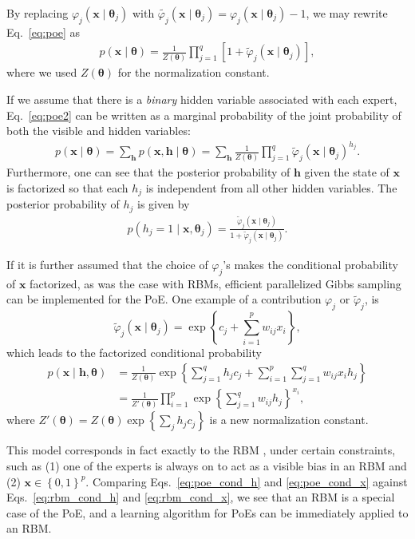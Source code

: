 \documentclass[dissertation,nocontribution]{aaltoseries}
\newcommand{\vect}[1]{\mathbf{#1}}
\newcommand{\vects}[1]{\boldsymbol{#1}}
\newcommand{\vh}[0]{\vect{h}}
\newcommand{\vx}[0]{\vect{x}}
\newcommand{\TT}[0]{{\vects{\theta}}}
\begin{document}
By replacing $\varphi_j(\vx \mid \TT_j)$ with
$\tilde{\varphi_j}(\vx \mid
\TT_j)=\varphi_j(\vx\mid\TT_j)-1$, we may rewrite
Eq.~\eqref{eq:poe} as
\begin{align}
    \label{eq:poe2}
    p(\vx \mid \TT) = \frac{1}{Z(\TT)}\prod_{j=1}^q \left[ 1 +
    \tilde{\varphi}_j(\vx \mid
    \TT_j)\right],
\end{align}
where we used $Z(\TT)$ for the normalization constant. 

If we assume that there is a \textit{binary} hidden variable
associated with each expert, Eq.~\eqref{eq:poe2} can be
written as a marginal probability of the joint
probability of both the visible and hidden variables:
\begin{align}
    \label{eq:poe2_joint}
    p(\vx \mid \TT) = \sum_{\vh} p(\vx, \vh \mid \TT) =
    \sum_{\vh} \frac{1}{Z(\TT)} \prod_{j=1}^q
    \tilde{\varphi}_j (\vx \mid \TT_j)^{h_j}.
\end{align}
Furthermore, one can 
see that the posterior
probability of $\vh$ given the state of $\vx$ is factorized
so that each $h_j$ is independent from all other hidden
variables. The posterior probability of $h_j$ is given by
\begin{align}
    \label{eq:poe_cond_h}
    p(h_j = 1 \mid \vx, \TT_j) = \frac{\tilde{\varphi}_j(\vx
    \mid \TT_j)}{1 + \tilde{\varphi}_j(\vx \mid \TT_j)}.
\end{align}

If it is further assumed that the choice of $\varphi_j$'s
makes the conditional probability of $\vx$ 
factorized, as was the case with RBMs, efficient 
parallelized Gibbs sampling can be implemented for the PoE.
One example of a contribution $\varphi_j$ or
$\tilde{\varphi}_j$, is 
\[
\tilde{\varphi}_j(\vx \mid \TT_j) = \exp\left\{ c_j +
\sum_{i=1}^p w_{ij} x_i \right\},
\]
which leads to the factorized conditional probability
\begin{align}
    \label{eq:poe_cond_x}
p(\vx \mid \vh, \TT) &= \frac{1}{Z(\TT)} \exp\left\{
\sum_{j=1}^q h_j c_j + \sum_{i=1}^p \sum_{j=1}^q w_{ij} x_i
h_j \right\} 
\nonumber \\
&= \frac{1}{Z'(\TT)} \prod_{i=1}^p \exp\left\{
\sum_{j=1}^q w_{ij} h_j
\right\}^{x_i},
\end{align}
where $Z'(\TT) = Z(\TT) \exp\left\{ \sum_j h_j c_j \right\}$
is a new normalization constant.

This model corresponds in fact exactly to the RBM
\citep{Freund1994}, under
certain constraints, such as (1) one of the experts is
always on to act as a visible bias in an RBM and (2) $\vx
\in \left\{ 0, 1 \right\}^p$. Comparing
Eqs.~\eqref{eq:poe_cond_h} and \eqref{eq:poe_cond_x} against
Eqs.~\eqref{eq:rbm_cond_h} and \eqref{eq:rbm_cond_x}, we see
that an RBM
is a special case of the PoE, and a learning algorithm for
PoEs can be immediately applied to an RBM.
\end{document}
